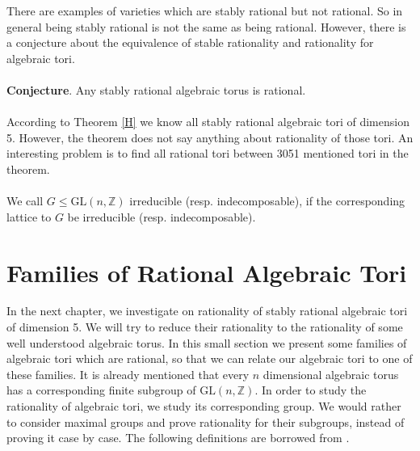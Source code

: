 \documentclass[a4paper, 14pt]{extarticle}
\theoremstyle{plain}
\theoremstyle{definition}
\newcommand{\Z}{\ensuremath{\mathbb{Z}}}
\newcommand{\G}{G}
\begin{document}
 \noindent
There are examples of varieties which are stably rational but not rational. So in general 
being stably rational is not the same as being rational. However, there is a conjecture 
about the equivalence of stable rationality and rationality for algebraic tori.\\ \\
 \textbf{Conjecture}. \cite[Section 2.6.1]{Voskresenskii} Any stably rational algebraic 
 torus is rational.\\
 \\
% 
According to Theorem \ref{H} we know all stably rational algebraic tori of dimension 5. 
However, the theorem does not say anything about rationality of those tori. An interesting 
problem is to find all rational tori between 3051 mentioned tori in the theorem.\\
\\

We call $\G \leq \mathrm{GL}(n,\Z)$ irreducible (resp. indecomposable), if the corresponding 
lattice to $G$ be irreducible (resp. indecomposable).
\\
 
\section{Families of Rational Algebraic Tori}
In the next chapter, we investigate on rationality of stably rational algebraic tori 
of dimension 5.  We will try to reduce their rationality to the rationality of some 
well understood algebraic torus. In this small section we present some families of 
algebraic tori which are rational, so that we can relate our algebraic tori to one 
of these families. It is already mentioned that every $n$ dimensional algebraic torus 
has a corresponding finite subgroup of $\mathrm{GL}(n,\Z)$. In order to study the 
rationality of algebraic tori, we study its corresponding group. We would rather to 
consider maximal groups and prove rationality for their subgroups, instead of proving 
it case by case. The following definitions are borrowed from \cite{Nicole1}.
\end{document}

